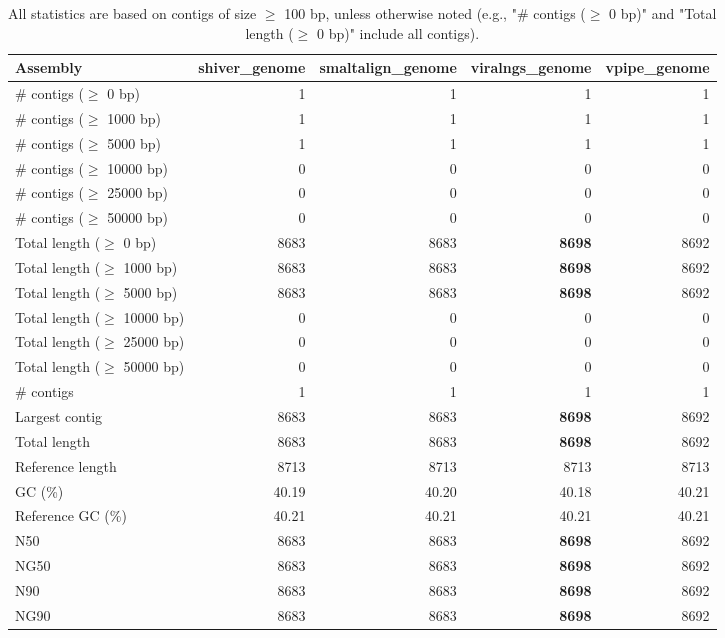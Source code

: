 \documentclass[12pt,a4paper]{article}
\begin{document}
\begin{table}[ht]
\begin{center}
\caption{All statistics are based on contigs of size $\geq$ 100 bp, unless otherwise noted (e.g., "\# contigs ($\geq$ 0 bp)" and "Total length ($\geq$ 0 bp)" include all contigs).}
\begin{tabular}{|l*{4}{|r}|}
\hline
Assembly & shiver\_genome & smaltalign\_genome & viralngs\_genome & vpipe\_genome \\ \hline
\# contigs ($\geq$ 0 bp) & 1 & 1 & 1 & 1 \\ \hline
\# contigs ($\geq$ 1000 bp) & 1 & 1 & 1 & 1 \\ \hline
\# contigs ($\geq$ 5000 bp) & 1 & 1 & 1 & 1 \\ \hline
\# contigs ($\geq$ 10000 bp) & 0 & 0 & 0 & 0 \\ \hline
\# contigs ($\geq$ 25000 bp) & 0 & 0 & 0 & 0 \\ \hline
\# contigs ($\geq$ 50000 bp) & 0 & 0 & 0 & 0 \\ \hline
Total length ($\geq$ 0 bp) & 8683 & 8683 & {\bf 8698} & 8692 \\ \hline
Total length ($\geq$ 1000 bp) & 8683 & 8683 & {\bf 8698} & 8692 \\ \hline
Total length ($\geq$ 5000 bp) & 8683 & 8683 & {\bf 8698} & 8692 \\ \hline
Total length ($\geq$ 10000 bp) & 0 & 0 & 0 & 0 \\ \hline
Total length ($\geq$ 25000 bp) & 0 & 0 & 0 & 0 \\ \hline
Total length ($\geq$ 50000 bp) & 0 & 0 & 0 & 0 \\ \hline
\# contigs & 1 & 1 & 1 & 1 \\ \hline
Largest contig & 8683 & 8683 & {\bf 8698} & 8692 \\ \hline
Total length & 8683 & 8683 & {\bf 8698} & 8692 \\ \hline
Reference length & 8713 & 8713 & 8713 & 8713 \\ \hline
GC (\%) & 40.19 & 40.20 & 40.18 & 40.21 \\ \hline
Reference GC (\%) & 40.21 & 40.21 & 40.21 & 40.21 \\ \hline
N50 & 8683 & 8683 & {\bf 8698} & 8692 \\ \hline
NG50 & 8683 & 8683 & {\bf 8698} & 8692 \\ \hline
N90 & 8683 & 8683 & {\bf 8698} & 8692 \\ \hline
NG90 & 8683 & 8683 & {\bf 8698} & 8692 \\ \hline

\end{tabular}
\end{center}
\end{table}
\end{document}
